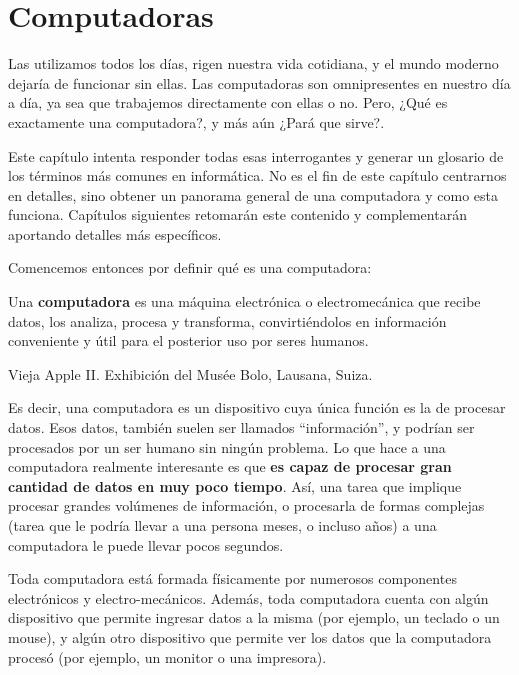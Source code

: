 
\chapter{Computadoras}

Las utilizamos todos los días, rigen nuestra vida cotidiana, y el mundo moderno
dejaría de funcionar sin ellas. Las computadoras son omnipresentes en nuestro
día a día, ya sea que trabajemos directamente con ellas o no. Pero,
¿Qué es exactamente una computadora?, y más aún ¿Pará que sirve?.

Este capítulo intenta responder todas esas interrogantes y generar un glosario
de los términos más comunes en informática. No es el fin de este capítulo
centrarnos en detalles, sino obtener un panorama general de una computadora y
como esta funciona. Capítulos siguientes retomarán este contenido y
complementarán aportando detalles más específicos.

Comencemos entonces por definir qué es una computadora:

\begin{definition}
    Una \textbf{computadora} es una máquina electrónica o electromecánica que recibe
    datos, los analiza, procesa y transforma, convirtiéndolos en información
    conveniente y útil para el posterior uso por seres humanos.\autocite[vid. p.10]{gookin_2005}
\end{definition}

{Vieja Apple II.}
{Exhibición del Musée Bolo, Lausana, Suiza.}

Es decir, una computadora es un dispositivo cuya única función es la de procesar
datos. Esos datos, también suelen ser llamados ``información'', y podrían
ser procesados por un ser humano sin ningún problema. Lo que hace a una
computadora realmente interesante es que \textbf{es capaz de procesar gran
cantidad de datos en muy poco tiempo}. Así, una tarea que implique procesar
grandes volúmenes de información, o procesarla de formas complejas (tarea que le
podría llevar a una persona meses, o incluso años) a una computadora le puede
llevar pocos segundos.\autocite[vid. p.8]{clark_scott_2009}

Toda computadora está formada físicamente por numerosos componentes electrónicos
y electro-mecánicos. Además, toda computadora cuenta con algún dispositivo que
permite ingresar datos a la misma (por ejemplo, un teclado o un mouse), y algún
otro dispositivo que permite ver los datos que la computadora procesó (por
ejemplo, un monitor o una impresora).

